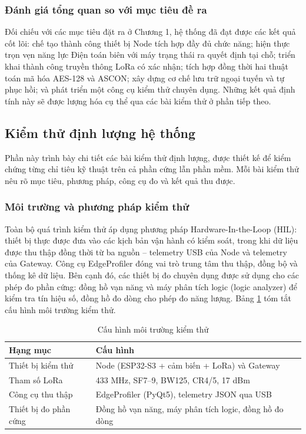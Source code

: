 \subsubsection{Đánh giá tổng quan so với mục tiêu đề ra}
Đối chiếu với các mục tiêu đặt ra ở Chương 1, hệ thống đã đạt được các kết quả cốt lõi: chế tạo thành công thiết bị Node tích hợp đầy đủ chức năng; hiện thực trọn vẹn năng lực Điện toán biên với máy trạng thái ra quyết định tại chỗ; triển khai thành công truyền thông LoRa có xác nhận; tích hợp đồng thời hai thuật toán mã hóa AES-128 và ASCON; xây dựng cơ chế lưu trữ ngoại tuyến và tự phục hồi; và phát triển một công cụ kiểm thử chuyên dụng. Những kết quả định tính này sẽ được lượng hóa cụ thể qua các bài kiểm thử ở phần tiếp theo.

\subsection{Kiểm thử định lượng hệ thống}
Phần này trình bày chi tiết các bài kiểm thử định lượng, được thiết kế để kiểm chứng từng chỉ tiêu kỹ thuật trên cả phần cứng lẫn phần mềm. Mỗi bài kiểm thử nêu rõ mục tiêu, phương pháp, công cụ đo và kết quả thu được.

\subsubsection{Môi trường và phương pháp kiểm thử}
Toàn bộ quá trình kiểm thử áp dụng phương pháp Hardware-In-the-Loop (HIL): thiết bị thực được đưa vào các kịch bản vận hành có kiểm soát, trong khi dữ liệu được thu thập đồng thời từ ba nguồn -- telemetry USB của Node và telemetry của Gateway. Công cụ EdgeProfiler đóng vai trò trung tâm thu thập, đồng bộ và thống kê dữ liệu. Bên cạnh đó, các thiết bị đo chuyên dụng được sử dụng cho các phép đo phần cứng: đồng hồ vạn năng và máy phân tích logic (logic analyzer) để kiểm tra tín hiệu số, đồng hồ đo dòng cho phép đo năng lượng. Bảng \ref{Bảng 5.2} tóm tắt cấu hình môi trường kiểm thử.

\begin{table}[H]
\centering
\caption{Cấu hình môi trường kiểm thử}
\label{Bảng 5.2}
\renewcommand{\arraystretch}{1.4}
\begin{tabular}{p{4.2cm} p{8.4cm}}
\hline
\textbf{Hạng mục} & \textbf{Cấu hình} \\ \hline
Thiết bị kiểm thử & Node (ESP32-S3 + cảm biến + LoRa) và Gateway \\
Tham số LoRa & 433 MHz, SF7--9, BW125, CR4/5, 17 dBm \\ 
Công cụ thu thập & EdgeProfiler (PyQt5), telemetry JSON qua USB \\
Thiết bị đo phần cứng & Đồng hồ vạn năng, máy phân tích logic, đồng hồ đo dòng \\ \hline

\end{tabular}
\end{table}

